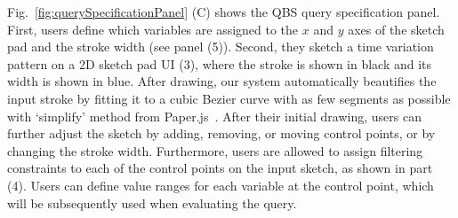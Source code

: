 Fig.~\ref{fig:querySpecificationPanel} (C) shows the QBS query specification panel.
First, users define which variables are assigned to the $x$ and $y$ axes of the sketch pad and the stroke width (see panel (5)).
Second, they sketch a time variation pattern on a 2D sketch pad UI (3),
where the stroke is shown in black and its width is shown in blue.
After drawing, our system automatically beautifies the input stroke by fitting it to a cubic Bezier curve with as few segments as possible with ‘simplify’ method from Paper.js~\cite{paper_framework}.
After their initial drawing, users can further adjust the sketch
by adding, removing, or moving control points, or by changing the stroke width.
Furthermore, users are allowed to assign filtering constraints to each of the control points on the input sketch, as shown in part (4).
Users can define value ranges for each variable at the control point, which will be subsequently used when evaluating the query.


